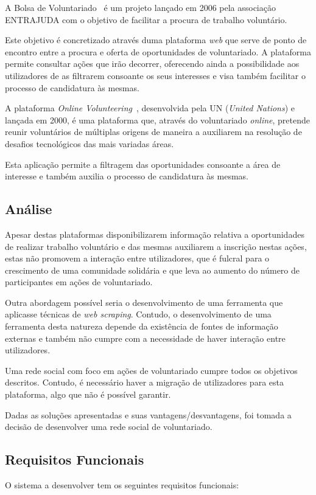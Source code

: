 A Bolsa de Voluntariado~\cite{Entrajuda2006} é um projeto lançado em 2006 pela associação ENTRAJUDA com o objetivo de facilitar a procura de trabalho voluntário. \medskip

Este objetivo é concretizado através duma plataforma \textit{web} que serve de ponto de encontro entre a procura e oferta de oportunidades de voluntariado. A plataforma permite consultar ações que irão decorrer, oferecendo ainda a possibilidade aos utilizadores de as filtrarem consoante os seus interesses e visa também facilitar o processo de candidatura às mesmas. \medskip

A plataforma \textit{Online Volunteering}~\cite{UniNations}, desenvolvida pela UN (\textit{United Nations}) e lançada em 2000, é uma plataforma que, através do voluntariado \textit{online}, pretende reunir voluntários de múltiplas origens de maneira a auxiliarem na resolução de desafios tecnológicos das mais variadas áreas. \medskip

Esta aplicação permite a filtragem das oportunidades consoante a área de interesse e também auxilia o processo de candidatura às mesmas. 

\subsection{Análise}

Apesar destas plataformas disponibilizarem informação relativa a oportunidades de realizar trabalho voluntário e das mesmas auxiliarem a inscrição nestas ações, estas não promovem a interação entre utilizadores, que é fulcral para o crescimento de uma comunidade solidária e que leva ao aumento do número de participantes em ações de voluntariado. \medskip

Outra abordagem possível seria o desenvolvimento de uma ferramenta que aplicasse técnicas de \textit{web scraping}. Contudo, o desenvolvimento de uma ferramenta desta natureza depende da existência de fontes de informação externas e também não cumpre com a necessidade de haver interação entre utilizadores. \medskip

Uma rede social com foco em ações de voluntariado cumpre todos os objetivos descritos. Contudo, é necessário haver a migração de utilizadores para esta plataforma, algo que não é possível garantir. \medskip

Dadas as soluções apresentadas e suas vantagens/desvantagens, foi tomada a decisão de desenvolver uma rede social de voluntariado.

\subsection{Requisitos Funcionais}
O sistema a desenvolver tem os seguintes requisitos funcionais:

